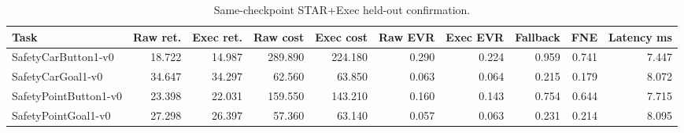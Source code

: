 \begin{table}[t]
\centering
\caption{Same-checkpoint STAR+Exec held-out confirmation.}
\label{tab:star-v2-executor}
\begin{tabular}{lrrrrrrrrr}
\toprule
Task & Raw ret. & Exec ret. & Raw cost & Exec cost & Raw EVR & Exec EVR & Fallback & FNE & Latency ms \\
\midrule
SafetyCarButton1-v0 & 18.722 & 14.987 & 289.890 & 224.180 & 0.290 & 0.224 & 0.959 & 0.741 & 7.447 \\
SafetyCarGoal1-v0 & 34.647 & 34.297 & 62.560 & 63.850 & 0.063 & 0.064 & 0.215 & 0.179 & 8.072 \\
SafetyPointButton1-v0 & 23.398 & 22.031 & 159.550 & 143.210 & 0.160 & 0.143 & 0.754 & 0.644 & 7.715 \\
SafetyPointGoal1-v0 & 27.298 & 26.397 & 57.360 & 63.140 & 0.057 & 0.063 & 0.231 & 0.214 & 8.095 \\
\bottomrule
\end{tabular}
\end{table}
